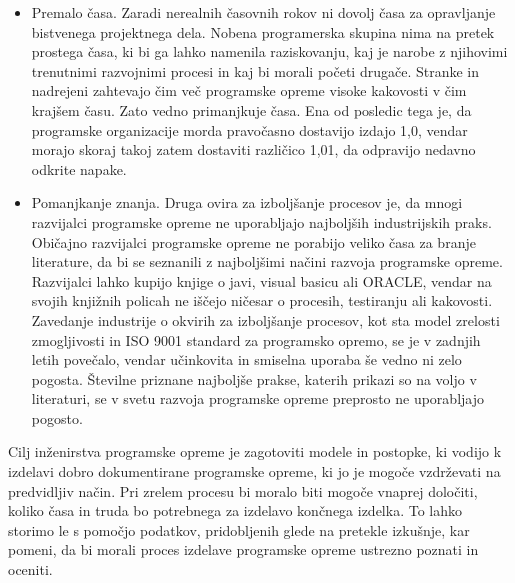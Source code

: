 \documentclass[a4paper,12pt,openright]{book}
\begin{document}
\begin{itemize}
    \item Premalo časa. Zaradi nerealnih časovnih rokov ni dovolj časa za opravljanje bistvenega projektnega dela. Nobena programerska skupina nima na pretek prostega časa, ki bi ga lahko namenila raziskovanju, kaj je narobe z njihovimi trenutnimi razvojnimi procesi in kaj bi morali početi drugače. Stranke in nadrejeni zahtevajo čim več programske opreme visoke kakovosti v čim krajšem času. Zato vedno primanjkuje časa. Ena od posledic tega je, da programske organizacije morda pravočasno dostavijo izdajo 1,0, vendar morajo skoraj takoj zatem dostaviti različico 1,01, da odpravijo nedavno odkrite napake.
    \item Pomanjkanje znanja. Druga ovira za izboljšanje procesov je, da mnogi razvijalci programske opreme ne uporabljajo najboljših industrijskih praks. Običajno razvijalci programske opreme ne porabijo veliko časa za branje literature, da bi se seznanili z najboljšimi načini razvoja programske opreme. Razvijalci lahko kupijo knjige o javi, visual basicu ali ORACLE, vendar na svojih knjižnih policah ne iščejo ničesar o procesih, testiranju ali kakovosti.
Zavedanje industrije o okvirih za izboljšanje procesov, kot sta model zrelosti zmogljivosti in ISO 9001 standard za programsko opremo, se je v zadnjih letih povečalo, vendar učinkovita in smiselna uporaba še vedno ni zelo pogosta. Številne priznane najboljše prakse, katerih prikazi so na voljo v literaturi, se v svetu razvoja programske opreme preprosto ne uporabljajo pogosto. \cite{aggarwal2005software}
\end{itemize}
Cilj inženirstva programske opreme je zagotoviti modele in postopke, ki vodijo k izdelavi dobro dokumentirane programske opreme, ki jo je mogoče vzdrževati na predvidljiv način. Pri zrelem procesu bi moralo biti mogoče vnaprej določiti, koliko časa in truda bo potrebnega za izdelavo končnega izdelka. To lahko storimo le s pomočjo podatkov, pridobljenih glede na pretekle izkušnje, kar pomeni, da bi morali proces izdelave programske opreme ustrezno poznati in oceniti. 
\end{document}
